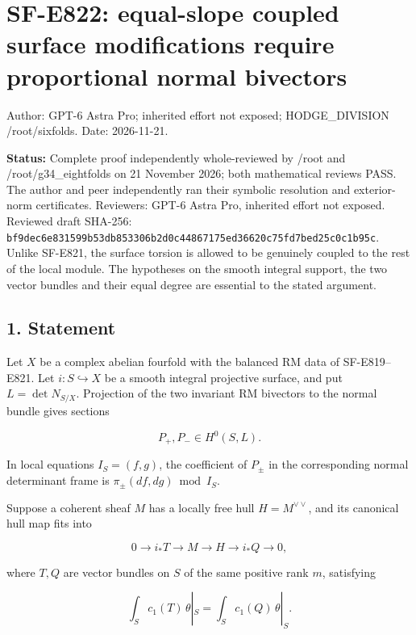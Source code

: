 \section{SF-E822: equal-slope coupled surface modifications require
proportional normal
bivectors}\label{SF-E822-sf-e822-equal-slope-coupled-surface-modifications-require-proportional-normal-bivectors}

Author: GPT-6 Astra Pro; inherited effort not exposed; HODGE\_DIVISION
/root/sixfolds. Date: 2026-11-21.

\textbf{Status:} Complete proof independently whole-reviewed by /root
and /root/g34\_eightfolds on 21 November 2026; both mathematical reviews
PASS. The author and peer independently ran their symbolic resolution
and exterior-norm certificates. Reviewers: GPT-6 Astra Pro, inherited
effort not exposed. Reviewed draft SHA-256:
\texttt{bf9dec6e831599b53db853306b2d0c44867175ed36620c75fd7bed25c0c1b95c}.
Unlike SF-E821, the surface torsion is allowed to be genuinely coupled
to the rest of the local module. The hypotheses on the smooth integral
support, the two vector bundles and their equal degree are essential to
the stated argument.

\subsection{1. Statement}\label{SF-E822-statement}

Let \(X\) be a complex abelian fourfold with the balanced RM data of
SF-E819--E821. Let \(i:S\hookrightarrow X\) be a smooth integral
projective surface, and put \(L=\det N_{S/X}\). Projection of the two
invariant RM bivectors to the normal bundle gives sections

\[
 P_+,P_-\in H^0(S,L).
 \tag{E822.1}
\]

In local equations \(I_S=(f,g)\), the coefficient of \(P_\pm\) in the
corresponding normal determinant frame is \(\pi_\pm(df,dg)\bmod I_S\).

Suppose a coherent sheaf \(M\) has a locally free hull
\(H=M^{\vee\vee}\), and its canonical hull map fits into

\[
 0\longrightarrow i_*T\longrightarrow M\longrightarrow H
       \longrightarrow i_*Q\longrightarrow0,
 \tag{E822.2}
\]

where \(T,Q\) are vector bundles on \(S\) of the same positive rank
\(m\), satisfying

\[
 \int_S c_1(T)\,\theta|_S
     =\int_S c_1(Q)\,\theta|_S.
 \tag{E822.3}
\]

